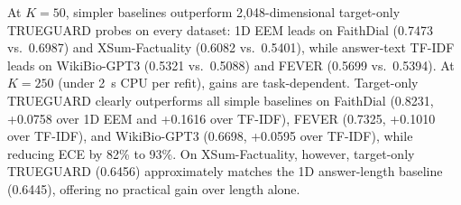 \documentclass{ieeeaccess}
\begin{document}
At $K = 50$, simpler baselines outperform 2,048-dimensional target-only TRUEGUARD probes on every dataset: 1D EEM leads on FaithDial (0.7473 vs.\ 0.6987) and XSum-Factuality (0.6082 vs.\ 0.5401), while answer-text TF-IDF leads on WikiBio-GPT3 (0.5321 vs.\ 0.5088) and FEVER (0.5699 vs.\ 0.5394). At $K = 250$ (under 2~s CPU per refit), gains are task-dependent. Target-only TRUEGUARD clearly outperforms all simple baselines on FaithDial (0.8231, +0.0758 over 1D EEM and +0.1616 over TF-IDF), FEVER (0.7325, +0.1010 over TF-IDF), and WikiBio-GPT3 (0.6698, +0.0595 over TF-IDF), while reducing ECE by 82\% to 93\%. On XSum-Factuality, however, target-only TRUEGUARD (0.6456) approximately matches the 1D answer-length baseline (0.6445), offering no practical gain over length alone.

\begin{table}[t]
\centering
\caption{Target-Domain Few-Shot Refitting (Target-Only Probe Training) vs.\ Source Recalibration and Simple Baselines}
\label{tab:fewshot}
\end{table}
\end{document}
